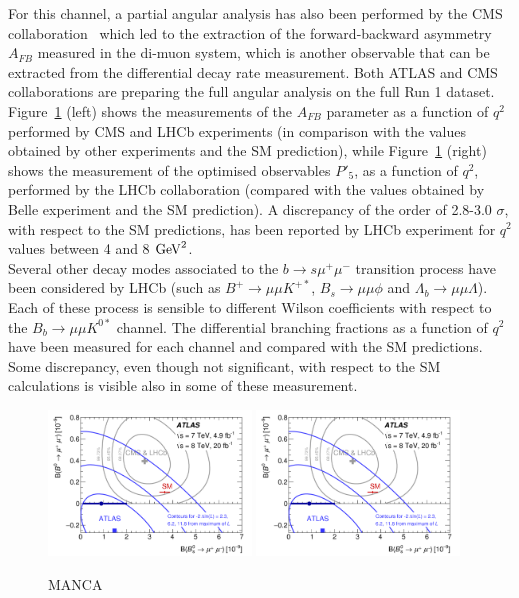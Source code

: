 \documentclass{PoS}
\begin{document}
For this channel, a partial angular analysis has also been performed by the CMS collaboration~\cite{mumuK_CMS} which led to the extraction of the forward-backward asymmetry $A_{FB}$  measured in the di-muon system, which is another observable that can be extracted from the differential decay rate measurement. Both ATLAS and CMS collaborations are preparing the full angular analysis on the full Run 1 dataset.  Figure~\ref{fig:mumuK} (left) shows the measurements of the $A_{FB}$ parameter as a function of $q^2$ performed by CMS and LHCb experiments (in comparison with the values obtained by other experiments and the SM prediction), while Figure~\ref{fig:mumuK} (right) shows the measurement of the optimised observables $P'_5$, as a function of $q^2$,  performed by the LHCb collaboration (compared with the values obtained by Belle experiment and the SM prediction). A discrepancy of the order of 2.8-3.0 $\sigma$, with respect to the SM predictions, has been reported by LHCb experiment for $q^2$ values between 4 and 8 ${\rm{GeV}}^2$.\\
Several other decay modes associated to the $b \to s \mu^+ \mu^-$ transition process have been considered by LHCb (such as $B^+ \to \mu \mu K^{+*}$, $B_s \to \mu \mu \phi$ and $\Lambda_b \to \mu \mu \Lambda$). Each of these process is sensible to different Wilson coefficients with respect to the $B_b \to \mu \mu K^{0*}$ channel. The differential branching fractions as a function of $q^2$ have been measured for each channel and compared with the SM predictions. Some discrepancy, even though not significant, with respect to the SM calculations is visible also in some of these measurement.\\
\begin{figure}[!t]
  \begin{center}
  \includegraphics[width=0.48\textwidth]{fig_09.png}
  \includegraphics[width=0.48\textwidth]{fig_09.png}
    \caption {MANCA}
        \label{fig:mumuK}
  \end{center}
\end{figure}
\end{document}
